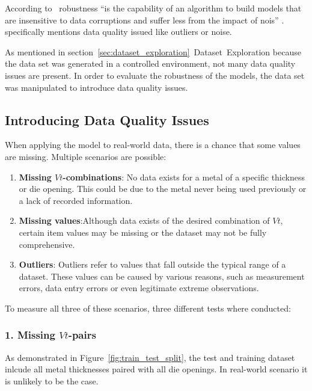 According to~\cite{saez_evaluatingclassifierbehavior_2016} robustness ``is the capability of an
algorithm to build models that are insensitive to data corruptions and suffer less from the
impact of nois'' \cite[p. 2]{saez_evaluatingclassifierbehavior_2016}.
\cite{siebert2022construction} specifically mentions data quality issued like outliers or noise.

As mentioned in section~\ref{sec:dataset_exploration}~Dataset~Exploration because the data set
was generated in a controlled environment, not many data quality issues are present.
In order to evaluate the robustness of the models, the data set was manipulated to introduce
data quality issues.

\subsection{Introducing Data Quality Issues}\label{subsec:missing-values}
When applying the model to real-world data, there is a chance that some values are missing.
Multiple scenarios are possible:

\begin{enumerate}
    \item \textbf{Missing $Vt$-combinations}: No data exists for a metal of a specific
    thickness or die opening. This could be due to the metal never being used previously or a
    lack of recorded information.
    \item \textbf{Missing values}:Although data exists of the desired combination of $Vt$,
    certain item values may be missing or the dataset may not be fully comprehensive.
    \item \textbf{Outliers}: Outliers refer to values that fall outside the typical range of a
    dataset.
    These values can be caused by various reasons, such as measurement errors, data
    entry errors or even legitimate extreme observations.
\end{enumerate}

To measure all three of these scenarios, three different tests where conducted:

\subsubsection*{1. Missing $Vt$-pairs}
As demonstrated in Figure~\ref{fig:train_test_split}, the test and training dataset inlcude all
metal thicknesses paired with all die openings.
In real-world scenario it is unlikely to be the case.

